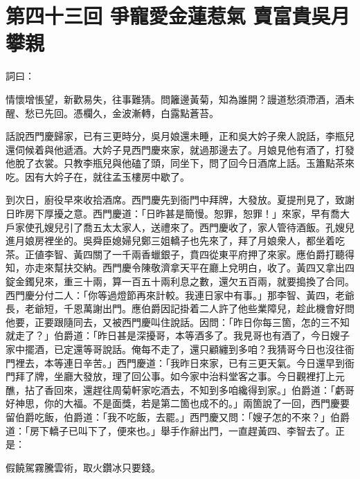 
\chapter*{第四十三回 爭寵愛金蓮惹氣 賣富貴吳月攀親}


詞曰：

\begin{myquote}
情懷增悵望，新歡易失，往事難猜。問籬邊黃菊，知為誰開？謾道愁須滯酒，酒未醒、愁已先回。憑欄久，金波漸轉，白露點蒼苔。

\end{myquote}

話說西門慶歸家，已有三更時分，吳月娘還未睡，正和吳大妗子衆人說話，李瓶兒還伺候着與他遞酒。大妗子見西門慶來家，就過那邊去了。月娘見他有酒了，打發他脫了衣裳。只教李瓶兒與他磕了頭，同坐下，問了回今日酒席上話。玉簫點茶來吃。因有大妗子在，就往孟玉樓房中歇了。

到次日，廚役早來收拾酒席。西門慶先到衙門中拜牌，大發放。夏提刑見了，致謝日昨房下厚擾之意。西門慶道：「日昨甚是簡慢。恕罪，恕罪！」來家，早有喬大戶家使孔嫂兒引了喬五太太家人，送禮來了。西門慶收了，家人管待酒飯。孔嫂兒進月娘房裡坐的。吳舜臣媳婦兒鄭三姐轎子也先來了，拜了月娘衆人，都坐着吃茶。正値李智、黃四關了一千兩香蠟銀子，賁四從東平府押了來家。應伯爵打聽得知，亦走來幫扶交納。西門慶令陳敬濟拿天平在廳上兌明白，收了。黃四又拿出四錠金鐲兒來，重三十兩，算一百五十兩利息之數，還欠五百兩，就要搗換了合同。西門慶分付二人：「你等過燈節再來計較。我連日家中有事。」那李智、黃四，老爺長，老爺短，千恩萬謝出門。應伯爵因記掛着二人許了他些業障兒，趁此機會好問他要，正要跟隨同去，又被西門慶叫住說話。因問：「昨日你每三箇，怎的三不知就走了？」伯爵道：「昨日甚是深擾哥，本等酒多了。我見哥也有酒了，今日嫂子家中擺酒，已定還等哥說話。俺每不走了，還只顧纏到多咱？我猜哥今日也沒往衙門裡去，本等連日辛苦。」西門慶道：「我昨日來家，已有三更天氣。今日還早到衙門拜了牌，坐廳大發放，理了回公事。如今家中治料堂客之事。今日觀裡打上元醮，拈了香回來，還趕往周菊軒家吃酒去，不知到多咱纔得到家。」伯爵道：「虧哥好神思，你的大福。不是面獎，若是第二箇也成不的。」{}兩箇說了一回，西門慶要留伯爵吃飯，伯爵道：「我不吃飯，去罷。」西門慶又問：「嫂子怎的不來？」伯爵道：「房下轎子已叫下了，便來也。」舉手作辭出門，一直趕黃四、李智去了。正是：

\begin{myquote}
假饒駕霧騰雲術，取火鑽冰只要錢。
\end{myquote}

